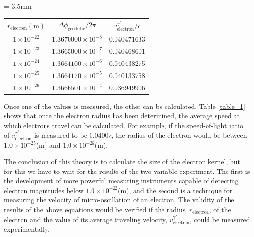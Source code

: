 \documentclass[%
 reprint,
 amsmath,amssymb,
 aps,
]{revtex4-1}
\numberwithin{equation}{section}%
\begin{document}
\begin{center}
    \begin{threeparttable}
        \caption{The velocity and the radius of an electron}
        \label{table_1}
        \tabcolsep = 3.5mm  %
        \renewcommand\arraystretch{1.2} %
        \begin{tabular}{ccc}
            \hline
        $ r_{\mathrm{electron}} {\mathrm{(m)}}$ & $\Delta \phi_{\mathrm{geodetic}}/{2 \pi}$ & $ v_{\text{electron}}^{\gamma^{*}} / c$ \\       \hline
        $1 \times 10^{-22}$ & $1.3670000 \times 10^{-8}$ & 0.040471633 \\ 
        $1 \times 10^{-23}$ & $1.3665000 \times 10^{-7}$ & 0.040468601 \\ 
        $1 \times 10^{-24}$ & $1.3664100 \times 10^{-6}$ & 0.040438275 \\ 
        $1 \times 10^{-25}$ & $1.3664170 \times 10^{-5}$ & 0.040133758 \\ 
        $1 \times 10^{-26}$ & $1.3666501 \times 10^{-4}$ & 0.036949906 \\ 
            \hline
        \end{tabular}
    \end{threeparttable}
\end{center}


Once one of the values is measured, the other can be calculated. Table \ref{table_1} shows that once the electron radius has been determined, the average speed at which electrons travel can be calculated. For example, if the speed-of-light ratio of $ v_{\text{electron}}^{\gamma^{*}} $ is measured to be 0.0400$c$, the radius of the electron would be between $1.0 \times 10^{-25}$(m) and $1.0 \times 10^{-26}$(m).


The conclusion of this theory is to calculate the size of the electron kernel, but for this we have to wait for the results of the two variable experiment. The first is the development of more powerful measuring instruments capable of detecting electron magnitudes below $1.0 \times 10^{-22}$(m), and the second is a technique for measuring the velocity of micro-oscillation of an electron. The validity of the results of the above equations would be verified if the radius, $r_{\mathrm{electron}}$, of the electron and the value of its average traveling velocity, $ v_{\text{electron}}^{\gamma^{*}} $, could be measured experimentally.
\end{document}
